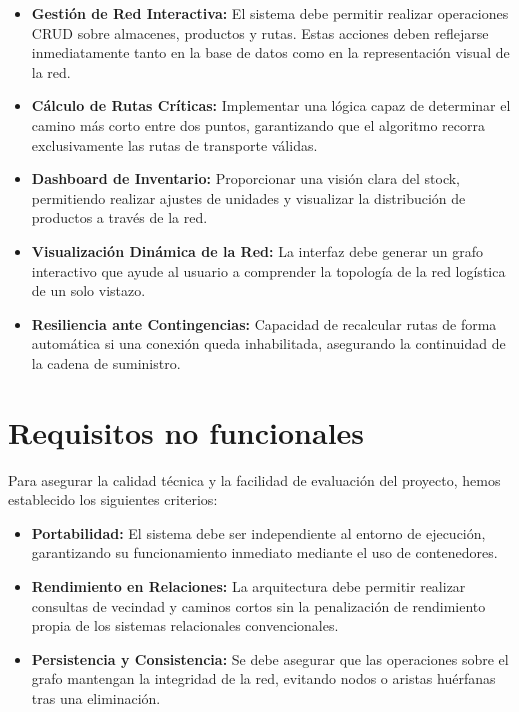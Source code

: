 \begin{itemize}
    \item \textbf{Gestión de Red Interactiva:} El sistema debe permitir realizar operaciones CRUD sobre almacenes, productos y rutas. Estas acciones deben reflejarse inmediatamente tanto en la base de datos como en la representación visual de la red.
    \item \textbf{Cálculo de Rutas Críticas:} Implementar una lógica capaz de determinar el camino más corto entre dos puntos, garantizando que el algoritmo recorra exclusivamente las rutas de transporte válidas.
    \item \textbf{Dashboard de Inventario:} Proporcionar una visión clara del stock, permitiendo realizar ajustes de unidades y visualizar la distribución de productos a través de la red.
    \item \textbf{Visualización Dinámica de la Red:} La interfaz debe generar un grafo interactivo que ayude al usuario a comprender la topología de la red logística de un solo vistazo.
    \item \textbf{Resiliencia ante Contingencias:} Capacidad de recalcular rutas de forma automática si una conexión queda inhabilitada, asegurando la continuidad de la cadena de suministro.
\end{itemize}

\section{Requisitos no funcionales}
Para asegurar la calidad técnica y la facilidad de evaluación del proyecto, hemos establecido los siguientes criterios:
\begin{itemize}
    \item \textbf{Portabilidad:} El sistema debe ser independiente al entorno de ejecución, garantizando su funcionamiento inmediato mediante el uso de contenedores.
    \item \textbf{Rendimiento en Relaciones:} La arquitectura debe permitir realizar consultas de vecindad y caminos cortos sin la penalización de rendimiento propia de los sistemas relacionales convencionales.
    \item \textbf{Persistencia y Consistencia:} Se debe asegurar que las operaciones sobre el grafo mantengan la integridad de la red, evitando nodos o aristas huérfanas tras una eliminación.
\end{itemize}
